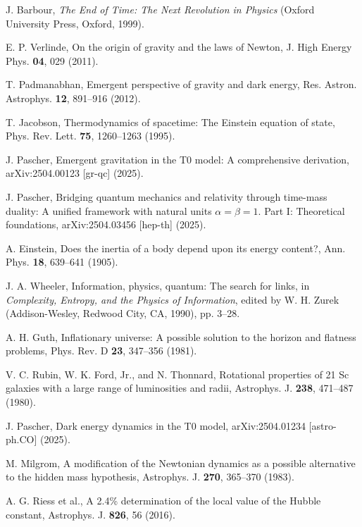 \documentclass[twocolumn,aps,prl]{revtex4-2}
\begin{document}
\begin{thebibliography}{99}
		 J. Barbour, \textit{The End of Time: The Next Revolution in Physics} (Oxford University Press, Oxford, 1999).
		
		 E. P. Verlinde, On the origin of gravity and the laws of Newton, J. High Energy Phys. \textbf{04}, 029 (2011).
		
		 T. Padmanabhan, Emergent perspective of gravity and dark energy, Res. Astron. Astrophys. \textbf{12}, 891--916 (2012).
		
		 T. Jacobson, Thermodynamics of spacetime: The Einstein equation of state, Phys. Rev. Lett. \textbf{75}, 1260--1263 (1995).
		
		 J. Pascher, Emergent gravitation in the T0 model: A comprehensive derivation, arXiv:2504.00123 [gr-qc] (2025).
		
		 J. Pascher, Bridging quantum mechanics and relativity through time-mass duality: A unified framework with natural units $\alpha = \beta = 1$. Part I: Theoretical foundations, arXiv:2504.03456 [hep-th] (2025).
		
		 A. Einstein, Does the inertia of a body depend upon its energy content?, Ann. Phys. \textbf{18}, 639--641 (1905).
		
		 J. A. Wheeler, Information, physics, quantum: The search for links, in \textit{Complexity, Entropy, and the Physics of Information}, edited by W. H. Zurek (Addison-Wesley, Redwood City, CA, 1990), pp. 3--28.
		
		 A. H. Guth, Inflationary universe: A possible solution to the horizon and flatness problems, Phys. Rev. D \textbf{23}, 347--356 (1981).
		
		 V. C. Rubin, W. K. Ford, Jr., and N. Thonnard, Rotational properties of 21 Sc galaxies with a large range of luminosities and radii, Astrophys. J. \textbf{238}, 471--487 (1980).
		
		 J. Pascher, Dark energy dynamics in the T0 model, arXiv:2504.01234 [astro-ph.CO] (2025).
		
		 M. Milgrom, A modification of the Newtonian dynamics as a possible alternative to the hidden mass hypothesis, Astrophys. J. \textbf{270}, 365--370 (1983).
		
		 A. G. Riess et al., A 2.4\% determination of the local value of the Hubble constant, Astrophys. J. \textbf{826}, 56 (2016).
		

\end{thebibliography}
\end{document}
